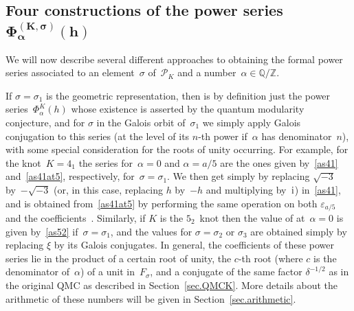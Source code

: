 \documentclass[pdftex]{sigma}
\numberwithin{equation}{section}
\def\BZ{\mathbb Z}
\def\BQ{\mathbb Q}
\def\calP{\mathcal P}
\def\calP{\mathcal P}
\def\a{\alpha}
\def\a{\alpha}
\def\s{\sigma}
\def\ve{\varepsilon}
\begin{document}
\subsection[Four constructions of the power series Phi\^{}\{(K,s)\}\_a(h)]{Four constructions of the power series $\boldsymbol{\Phi^{(K,\s)}_\a(h)}$}
\label{sub.Formal}

We will now describe several different approaches to obtaining the formal
power series \smash{$\Phi^{(K,\s)}_\a(h)$} associated to an element~$\s$ of~$\calP_K$
and a number~$\a\in\BQ/\BZ$.

If $\s=\s_1$ is the geometric representation, then \smash{$\Phi^{(K,\s)}_\a(h)$} is
by definition just the power series~$\Phi^K_\a(h)$ whose existence is
asserted by the quantum modularity conjecture, and for $\s$ in the Galois
orbit of~$\s_1$ we simply apply Galois conjugation to this series (at the
level of its $n$-th power if~$\a$ has denominator~$n$), with some special
consideration for the roots of unity occurring. For example, for the
knot~$K=4_1$ the series \smash{$\Phi^{(K,\s)}_\a(h)$} for~$\a=0$ and $\a=a/5$ are the
ones given by~\eqref{as41} and~\eqref{as41at5}, respectively, for~$\s=\s_1$.
We then get \smash{$\Phi^{(K,\s_2)}_0$} simply by replacing $\sqrt{-3}$ by~$-\sqrt{-3}$
(or, in this case, replacing $h$ by~$-h$ and multiplying by~${\rm i}$) in~\eqref{as41},
and \smash{$\Phi^{(4_1,\s_2)}_{a/5}$} is obtained from~\eqref{as41at5} by performing the
same operation on both $\ve_{a/5}$ and the coefficients~. Similarly,
if $K$ is the $5_2$~knot then the value of \smash{$\Phi^{(K,\s)}_\a(h)$} at~$\a=0$ is given
by~\eqref{as52} if~$\s=\s_1$, and the values for $\s=\s_2$ or $\s_3$ are obtained
simply by replacing $\xi$ by its Galois conjugates. In general, the coefficients
of these power series lie in the product of a certain root of unity, the $c$-th
root (where $c$ is the denominator of~$\a$) of a unit in~$F_\s$, and a
conjugate of the same factor $\delta^{-1/2}$ as in the original QMC as described
in Section~\ref{sec.QMCK}. More details about the arithmetic of these numbers
will be given in Section~\ref{sec.arithmetic}.
\end{document}
